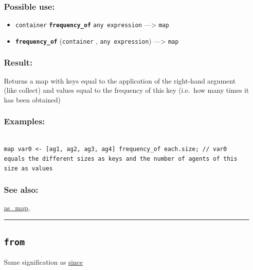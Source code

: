 \documentclass[]{book}
\providecommand{\tightlist}{%
  \setlength{\itemsep}{0pt}\setlength{\parskip}{0pt}}
\theoremstyle{definition}
\theoremstyle{definition}
\theoremstyle{definition}
\theoremstyle{remark}
\begin{document}
\subsubsection{Possible use:}\label{possible-use-174}

\begin{itemize}
\tightlist
\item
  \texttt{container} \textbf{\texttt{frequency\_of}}
  \texttt{any\ expression} ---\textgreater{} \texttt{map}
\item
  \textbf{\texttt{frequency\_of}} (\texttt{container} ,
  \texttt{any\ expression}) ---\textgreater{} \texttt{map}
\end{itemize}

\subsubsection{Result:}\label{result-168}

Returns a map with keys equal to the application of the right-hand
argument (like collect) and values equal to the frequency of this key
(i.e.~how many times it has been obtained)

\subsubsection{Examples:}\label{examples-129}

\begin{verbatim}
 
map var0 <- [ag1, ag2, ag3, ag4] frequency_of each.size; // var0 equals the different sizes as keys and the number of agents of this size as values
\end{verbatim}

\subsubsection{See also:}\label{see-also-99}

\href{operators-a-to-a.html\#as_map}{as\_map},

\begin{center}\rule{0.5\linewidth}{\linethickness}\end{center}

\subsection{\texorpdfstring{\texttt{from}}{from}}\label{from}

Same signification as \href{operators-s-to-z.html\#since}{since}
\end{document}
